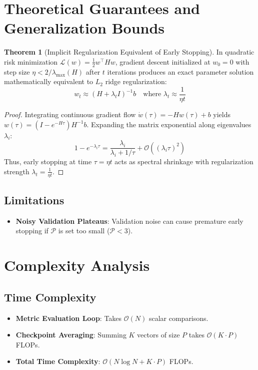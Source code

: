 \documentclass[11pt,a4paper]{article}
\theoremstyle{definition}
\newtheorem{theorem}{Theorem}[section]
\begin{document}
\section{Theoretical Guarantees and Generalization Bounds}

\begin{theorem}[Implicit Regularization Equivalent of Early Stopping]
In quadratic risk minimization $\mathcal{L}(w) = \frac{1}{2} w^\top H w$, gradient descent initialized at $w_0 = 0$ with step size $\eta < 2/\lambda_{\text{max}}(H)$ after $t$ iterations produces an exact parameter solution mathematically equivalent to $L_2$ ridge regularization:
\begin{equation}
w_t \approx (H + \lambda_t I)^{-1} b \quad \text{where } \lambda_t \approx \frac{1}{\eta t}
\end{equation}
\end{theorem}

\begin{proof}
Integrating continuous gradient flow $\dot{w}(\tau) = -H w(\tau) + b$ yields $w(\tau) = (I - e^{-H \tau}) H^{-1} b$.
Expanding the matrix exponential along eigenvalues $\lambda_i$:
\begin{equation}
1 - e^{-\lambda_i \tau} = \frac{\lambda_i}{\lambda_i + 1/\tau} + \mathcal{O}((\lambda_i \tau)^2)
\end{equation}
Thus, early stopping at time $\tau = \eta t$ acts as spectral shrinkage with regularization strength $\lambda_t = \frac{1}{\eta t}$.
\end{proof}

\subsection{Limitations}
\begin{itemize}
    \item \textbf{Noisy Validation Plateaus}: Validation noise can cause premature early stopping if $\mathcal{P}$ is set too small ($\mathcal{P} < 3$).
\end{itemize}

\section{Complexity Analysis}

\subsection{Time Complexity}
\begin{itemize}
    \item \textbf{Metric Evaluation Loop}: Takes $\mathcal{O}(N)$ scalar comparisons.
    \item \textbf{Checkpoint Averaging}: Summing $K$ vectors of size $P$ takes $\mathcal{O}(K \cdot P)$ FLOPs.
    \item \textbf{Total Time Complexity}: $\mathcal{O}(N \log N + K \cdot P)$ FLOPs.
\end{itemize}
\end{document}
